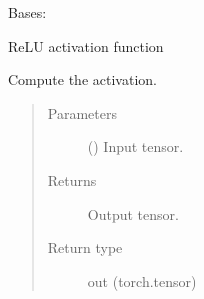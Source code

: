 \documentclass[letterpaper,10pt,english]{sphinxmanual}
\begin{document}

\begin{fulllineitems}
\label{\detokenize{nn:nn.activation.ReLU}}
Bases: {\hyperref[\detokenize{nn:nn.activation.Activation}]{}}

ReLU activation function

\begin{fulllineitems}
\label{\detokenize{nn:nn.activation.ReLU.forward}}
Compute the activation.
\begin{quote}\begin{description}
\item[{Parameters}] \leavevmode
{} () \textendash{} Input tensor.

\item[{Returns}] \leavevmode
Output tensor.

\item[{Return type}] \leavevmode
out (torch.tensor)

\end{description}\end{quote}

\end{fulllineitems}


\end{fulllineitems}

\end{document}
